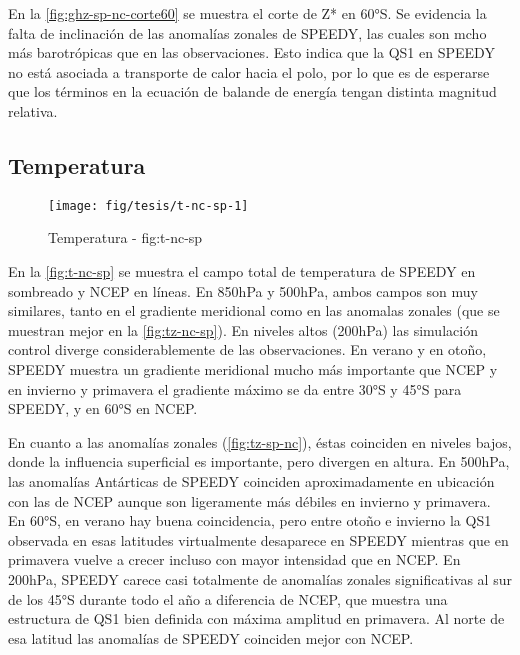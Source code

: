 \documentclass[spanish,a4paper,12p]{book}
\begin{document}
En la \autoref{fig:ghz-sp-nc-corte60} se muestra el corte de Z* en 60°S.
Se evidencia la falta de inclinación de las anomalías zonales de SPEEDY,
las cuales son mcho más barotrópicas que en las observaciones. Esto
indica que la QS1 en SPEEDY no está asociada a transporte de calor hacia
el polo, por lo que es de esperarse que los términos en la ecuación de
balande de energía tengan distinta magnitud
relativa.

\subsection{Temperatura}\label{temperatura-1}

\begin{landscape}\begin{figure}

{\centering \texttt{[image: fig/tesis/t-nc-sp-1]} 

}

\caption{Temperatura - fig:t-nc-sp}\label{fig:t-nc-sp}
\end{figure}
\end{landscape}

En la \autoref{fig:t-nc-sp} se muestra el campo total de temperatura de
SPEEDY en sombreado y NCEP en líneas. En 850hPa y 500hPa, ambos campos
son muy similares, tanto en el gradiente meridional como en las anomalas
zonales (que se muestran mejor en la \autoref{fig:tz-nc-sp}). En niveles
altos (200hPa) las simulación control diverge considerablemente de las
observaciones. En verano y en otoño, SPEEDY muestra un gradiente
meridional mucho más importante que NCEP y en invierno y primavera el
gradiente máximo se da entre 30°S y 45°S para SPEEDY, y en 60°S en NCEP.

En cuanto a las anomalías zonales (\autoref{fig:tz-sp-nc}), éstas
coinciden en niveles bajos, donde la influencia superficial es
importante, pero divergen en altura. En 500hPa, las anomalías Antárticas
de SPEEDY coinciden aproximadamente en ubicación con las de NCEP aunque
son ligeramente más débiles en invierno y primavera. En 60°S, en verano
hay buena coincidencia, pero entre otoño e invierno la QS1 observada en
esas latitudes virtualmente desaparece en SPEEDY mientras que en
primavera vuelve a crecer incluso con mayor intensidad que en NCEP. En
200hPa, SPEEDY carece casi totalmente de anomalías zonales
significativas al sur de los 45°S durante todo el año a diferencia de
NCEP, que muestra una estructura de QS1 bien definida con máxima
amplitud en primavera. Al norte de esa latitud las anomalías de SPEEDY
coinciden mejor con NCEP.
\end{document}
